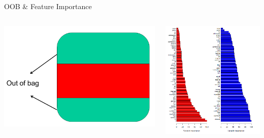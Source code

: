 \documentclass[10pt]{beamer}
\begin{document}
\begin{frame}{OOB \& Feature Importance}
\begin{columns}[C]
    \begin{column}{.4\textwidth}
        \begin{center}
            \includegraphics[scale=0.15]{images/outofbag.png}
        \end{center}
    \end{column}
    \begin{column}{.6\textwidth}
        \begin{center}
            \includegraphics[scale=0.2]{images/impotance.png}
        \end{center}
    \end{column}
\end{columns}
\end{frame}
\end{document}
